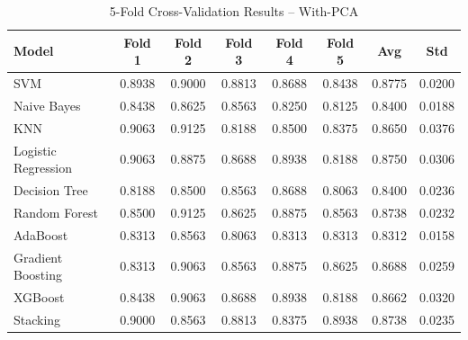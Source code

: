 \documentclass[12pt,a4paper]{article}
\begin{document}
\begin{table}[H]
\centering
\caption{5-Fold Cross-Validation Results -- With-PCA}
\begin{tabular}{lccccccc}
\toprule
Model & Fold 1 & Fold 2 & Fold 3 & Fold 4 & Fold 5 & Avg & Std \\
\midrule
SVM & 0.8938 & 0.9000 & 0.8813 & 0.8688 & 0.8438 & 0.8775 & 0.0200 \\
Naive Bayes & 0.8438 & 0.8625 & 0.8563 & 0.8250 & 0.8125 & 0.8400 & 0.0188 \\
KNN & 0.9063 & 0.9125 & 0.8188 & 0.8500 & 0.8375 & 0.8650 & 0.0376 \\
Logistic Regression & 0.9063 & 0.8875 & 0.8688 & 0.8938 & 0.8188 & 0.8750 & 0.0306 \\
Decision Tree & 0.8188 & 0.8500 & 0.8563 & 0.8688 & 0.8063 & 0.8400 & 0.0236 \\
Random Forest & 0.8500 & 0.9125 & 0.8625 & 0.8875 & 0.8563 & 0.8738 & 0.0232 \\
AdaBoost & 0.8313 & 0.8563 & 0.8063 & 0.8313 & 0.8313 & 0.8312 & 0.0158 \\
Gradient Boosting & 0.8313 & 0.9063 & 0.8563 & 0.8875 & 0.8625 & 0.8688 & 0.0259 \\
XGBoost & 0.8438 & 0.9063 & 0.8688 & 0.8938 & 0.8188 & 0.8662 & 0.0320 \\
Stacking & 0.9000 & 0.8563 & 0.8813 & 0.8375 & 0.8938 & 0.8738 & 0.0235 \\
\bottomrule
\end{tabular}
\end{table}
\end{document}
